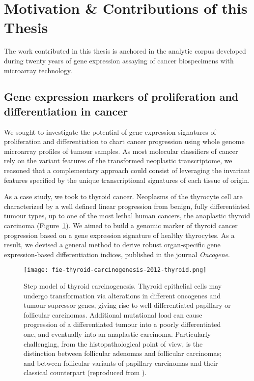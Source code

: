 \section{Motivation \& Contributions of this Thesis}

The work contributed in this thesis is anchored in the analytic corpus developed
during twenty years of gene expression assaying of cancer biospecimens with
microarray
technology.  %

\subsection{Gene expression markers of proliferation and
  differentiation in cancer}
We sought to investigate the potential of gene expression signatures of
proliferation and differentiation to chart cancer progression using whole genome
microarray profiles of tumour samples.  As most molecular classifiers of cancer
rely on the variant features of the transformed neoplastic transcriptome, we
reasoned that a complementary approach could consist of leveraging the invariant
features specified by the unique transcriptional signatures of each tissue of
origin.

As a case study, we took to thyroid cancer.  Neoplasms of the thyrocyte cell are
characterized by a well defined linear progression from benign, fully
differentiated tumour types, up to one of the most lethal human cancers, the
anaplastic thyroid carcinoma (Figure~\ref{fig:thyroid-carcinogenesis}).  We
aimed to build a genomic marker of thyroid cancer progression based on a gene
expression signature of healthy thyrocytes.  As a result, we devised a general
method to derive robust \mbox{organ-specific} gene \mbox{expression-based}
differentiation indices, published in the journal
\emph{Oncogene}.\cite{tomas_general_2012}

\begin{figure}[ht]
  \texttt{[image: fie-thyroid-carcinogenesis-2012-thyroid.png]}%
  \caption[Step model of thyroid carcinogenesis]{Step model of thyroid
    carcinogenesis.  Thyroid epithelial cells may undergo transformation via
    alterations in different oncogenes and tumour supressor genes, giving rise
    to \mbox{well-differentiated} papillary or follicular carcinomas.
    Additional mutational load can cause progression of a differentiated tumour
    into a poorly differentiated one, and eventually into an anaplastic
    carcinoma.  Particularly challenging, from the histopathological point of
    view, is the distinction between follicular adenomas and follicular
    carcinomas; and between follicular variants of papillary carcinomas and
    their classical counterpart (reproduced from
    \citealp{sastre-perona_role_2012}).}
  \label{fig:thyroid-carcinogenesis}
\end{figure}


